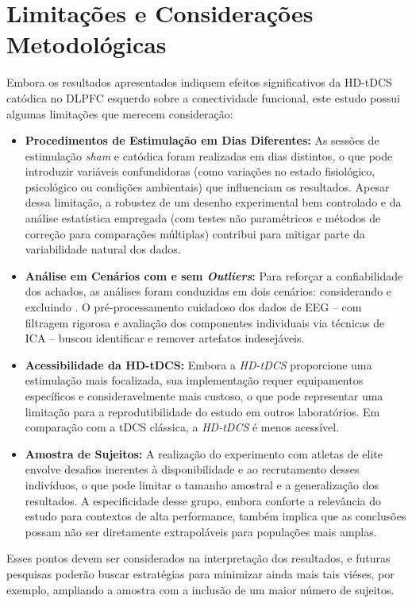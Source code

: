 \section{Limitações e Considerações Metodológicas}
\label{sec:limitacoes}
Embora os resultados apresentados indiquem efeitos significativos da HD-tDCS catódica no DLPFC esquerdo sobre a conectividade funcional, este estudo possui algumas limitações que merecem consideração:

\begin{itemize}
    \item \textbf{Procedimentos de Estimulação em Dias Diferentes:} As sessões de estimulação \emph{sham} e catódica foram realizadas em dias distintos, o que pode introduzir variáveis confundidoras (como variações no estado fisiológico, psicológico ou condições ambientais) que influenciam os resultados. Apesar dessa limitação, a robustez de um desenho experimental bem controlado e da análise estatística empregada (com testes não paramétricos e métodos de correção para comparações múltiplas) contribui para mitigar parte da variabilidade natural dos dados.
    
    \item \textbf{Análise em Cenários com e sem \textit{Outliers}:} Para reforçar a confiabilidade dos achados, as análises foram conduzidas em dois cenários: considerando e excluindo . O pré-processamento cuidadoso dos dados de EEG – com filtragem rigorosa e avaliação dos componentes individuais via técnicas de ICA – buscou identificar e remover artefatos indesejáveis.
    
    \item \textbf{Acessibilidade da HD-tDCS:} Embora a \emph{HD-tDCS} proporcione uma estimulação mais focalizada, sua implementação requer equipamentos específicos e consideravelmente mais custoso, o que pode representar uma limitação para a reprodutibilidade do estudo em outros laboratórios. Em comparação com a tDCS clássica, a \emph{HD-tDCS} é menos acessível.
    
    \item \textbf{Amostra de Sujeitos:} A realização do experimento com atletas de elite envolve desafios inerentes à disponibilidade e ao recrutamento desses indivíduos, o que pode limitar o tamanho amostral e a generalização dos resultados. A especificidade desse grupo, embora conforte a relevância do estudo para contextos de alta performance, também implica que as conclusões possam não ser diretamente extrapoláveis para populações mais amplas.
\end{itemize}

Esses pontos devem ser considerados na interpretação dos resultados, e futuras pesquisas poderão buscar estratégias para minimizar ainda mais tais viéses, por exemplo, ampliando a amostra com a inclusão de um maior número de sujeitos.
